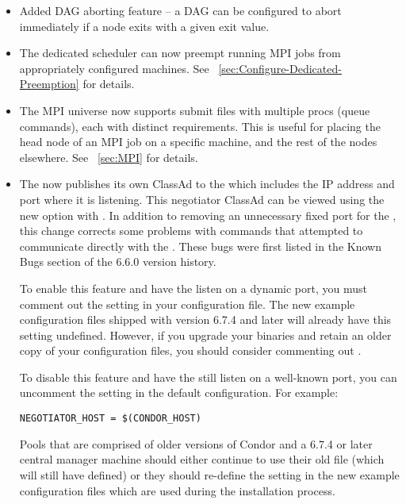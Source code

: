 \begin{itemize}

\item Added DAG aborting feature -- a DAG can be configured to
abort immediately if a node exits with a given exit value.

\item The dedicated scheduler can now preempt running MPI jobs from 
appropriately configured machines. See 
~\ref{sec:Configure-Dedicated-Preemption} for details.

\item The MPI universe now supports submit files with multiple procs (queue 
commands), each with distinct requirements.  This is useful for placing
the head node of an MPI job on a specific machine, and the rest of the 
nodes elsewhere. See ~\ref{sec:MPI} for details.

\item The  now publishes its own ClassAd to the
   which includes the IP address and port where it
  is listening.
  This negotiator ClassAd can be viewed using the new
   option with .
  In addition to removing an unnecessary fixed port for the
  , this change corrects some problems with
  commands that attempted to communicate directly with the
  .
  These bugs were first listed in the Known Bugs section of the 6.6.0
  version history.

  To enable this feature and have the  listen on a
  dynamic port, you must comment out the 
  setting in your configuration file.
  The new example configuration files shipped with version 6.7.4 and
  later will already have this setting undefined.
  However, if you upgrade your binaries and retain an older copy of
  your configuration files, you should consider commenting out 
  .

  To disable this feature and have the  still
  listen on a well-known port, you can uncomment the
   setting in the default configuration. 
  For example:
\begin{verbatim}
NEGOTIATOR_HOST = $(CONDOR_HOST)
\end{verbatim}

  Pools that are comprised of older versions of Condor and a 6.7.4 or
  later central manager machine should either continue to use their
  old  file (which will still have
   defined) or they should re-define the
   setting in the new example configuration
  files which are used during the installation process.


\end{itemize}
